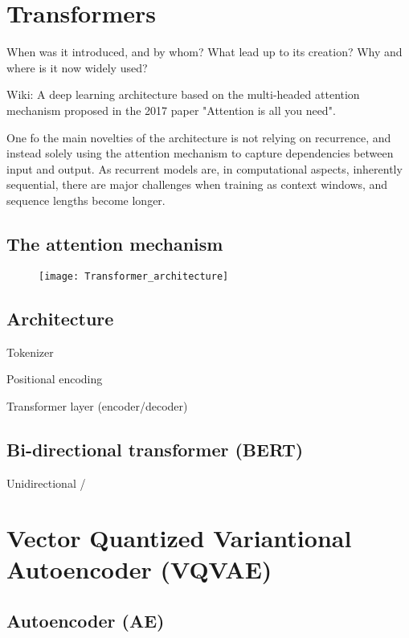 \documentclass[../../thesis.tex]{subfiles}
\begin{document}
\section{Transformers}

When was it introduced, and by whom?
What lead up to its creation?
Why and where is it now widely used? 


Wiki: A deep learning architecture based on the multi-headed attention mechanism proposed in the 2017 paper "Attention is all you need".

One fo the main novelties of the architecture is not relying on recurrence, and instead solely using the attention mechanism to capture dependencies between input and output. As recurrent models are, in computational aspects, inherently sequential, there are major challenges when training as context windows, and sequence lengths become longer. 



\subsection{The attention mechanism}


\begin{figure}[h]
    \texttt{[image: Transformer\_architecture]}
    \centering    
\end{figure}

\subsection{Architecture}

Tokenizer

Positional encoding


Transformer layer (encoder/decoder)

\subsection{Bi-directional transformer (BERT)}

Unidirectional / 



\section{Vector Quantized Variantional Autoencoder (VQVAE)}
\subsection{Autoencoder (AE)}
\end{document}
